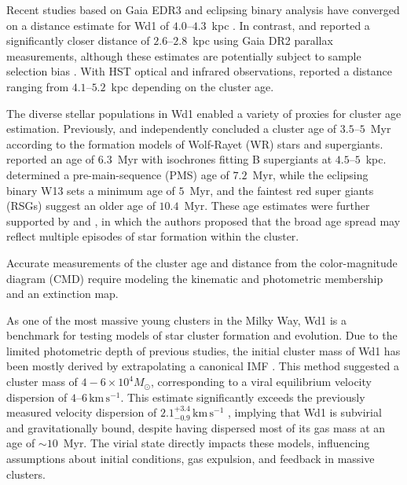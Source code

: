 \documentclass[12pt]{ucsddissertation}
\begin{document}
\begin{CJK*}{UTF8}{gbsn}
Recent studies based on Gaia EDR3 and eclipsing binary analysis have converged on a distance estimate for Wd1 of $4.0$--$4.3$~kpc \citep[][]{Beasor-2021, Navarete-2022, Negueruela-2022}. In contrast, \citet{Aghakhanloo-2020} and \citet{Aghakhanloo-2021} reported a significantly closer distance of $2.6$--$2.8$~kpc using Gaia DR2 parallax measurements, although these estimates are potentially subject to sample selection bias \citep[][]{Negueruela-2022}. With HST optical and infrared observations, \citet{Hosek-2018} reported a distance ranging from $4.1$--$5.2$~kpc depending on the cluster age.

The diverse stellar populations in Wd1 enabled a variety of proxies for cluster age estimation. Previously, \citet{Clark-2005} and \citet{Crowther-2006} independently concluded a cluster age of $3.5$--$5$~Myr according to the formation models of Wolf-Rayet (WR) stars and supergiants. \citet{Negueruela-2010} reported an age of $6.3$~Myr with isochrones fitting B supergiants at $4.5$--$5$~kpc. \citet{Beasor-2021} determined a pre-main-sequence (PMS) age of $7.2$~Myr, while the eclipsing binary W13 sets a minimum age of $5$~Myr, and the faintest red super giants (RSGs) suggest an older age of $10.4$~Myr. These age estimates were further supported by \citet{Navarete-2022} and \citet{Rocha-2022}, in which the authors proposed that the broad age spread may reflect multiple episodes of star formation within the cluster.

Accurate measurements of the cluster age and distance from the color-magnitude diagram (CMD) require modeling the kinematic and photometric membership and an extinction map.

As one of the most massive young clusters in the Milky Way, Wd1 is a benchmark for testing models of star cluster formation and evolution. Due to the limited photometric depth of previous studies, the initial cluster mass of Wd1 has been mostly derived by extrapolating a canonical IMF \citep[][]{Brandner-2008, Clark-2005, Andersen-2017}. This method suggested a cluster mass of $4-6\times10^4 M_\odot$, corresponding to a viral equilibrium velocity dispersion of $4$--$6\,\mathrm{km}\,\mathrm{s}^{-1}$. This estimate significantly exceeds the previously measured velocity dispersion of $2.1^{+3.4}_{-0.9}\,\mathrm{km}\,\mathrm{s}^{-1}$ \citep[][]{Cottaar-2012}, implying that Wd1 is subvirial and gravitationally bound, despite having dispersed most of its gas mass at an age of $\sim10$~Myr. The virial state directly impacts these models, influencing assumptions about initial conditions, gas expulsion, and feedback in massive clusters.


\end{CJK*}
\end{document}
